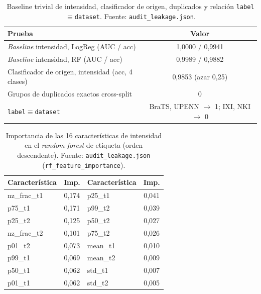\begin{table}[ht]
  \centering
  \caption[Auditoría de fuga: baseline trivial y clasificador de origen]{Baseline
  trivial de intensidad, clasificador de origen, duplicados y relación
  \texttt{label}$\equiv$\texttt{dataset}. Fuente: \texttt{audit\_leakage.json}.}
  \label{tab:apx_leak}
  \begin{tabular}{l c}
    \hline
    \textbf{Prueba} & \textbf{Valor} \\
    \hline
    \emph{Baseline} intensidad, LogReg (AUC / acc) & 1,0000 / 0,9941 \\
    \emph{Baseline} intensidad, RF (AUC / acc)     & 0,9989 / 0,9882 \\
    Clasificador de origen, intensidad (acc, 4 clases) & 0,9853 (azar 0,25) \\
    Grupos de duplicados exactos cross-split       & 0 \\
    \texttt{label}$\equiv$\texttt{dataset} & BraTS, UPENN $\to$ 1; IXI, NKI $\to$ 0 \\
    \hline
  \end{tabular}
\end{table}

\begin{table}[ht]
  \centering
  \caption[Importancia de las características de intensidad]{Importancia de las 16
  características de intensidad en el \emph{random forest} de etiqueta (orden
  descendente). Fuente: \texttt{audit\_leakage.json} (\texttt{rf\_feature\_importance}).}
  \label{tab:apx_featimp}
  \begin{tabular}{l c l c}
    \hline
    \textbf{Característica} & \textbf{Imp.} & \textbf{Característica} & \textbf{Imp.} \\
    \hline
    nz\_frac\_t1 & 0,174 & p25\_t1 & 0,041 \\
    p75\_t1      & 0,171 & p99\_t2 & 0,039 \\
    p25\_t2      & 0,125 & p50\_t2 & 0,027 \\
    nz\_frac\_t2 & 0,101 & p75\_t2 & 0,026 \\
    p01\_t2      & 0,073 & mean\_t1 & 0,010 \\
    p99\_t1      & 0,069 & mean\_t2 & 0,009 \\
    p50\_t1      & 0,062 & std\_t1 & 0,007 \\
    p01\_t1      & 0,062 & std\_t2 & 0,005 \\
    \hline
  \end{tabular}
\end{table}

